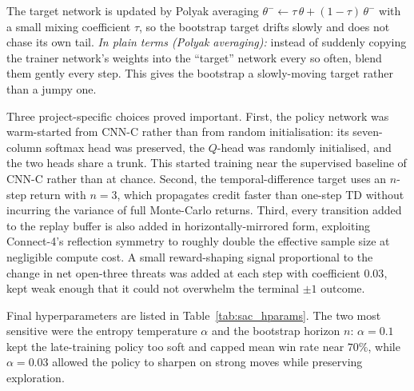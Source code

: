 \documentclass[11pt]{article}
\begin{document}
The target network is updated by Polyak averaging
$\theta^{-} \leftarrow \tau\,\theta + (1 - \tau)\,\theta^{-}$ with a
small mixing coefficient $\tau$, so the bootstrap target drifts slowly
and does not chase its own tail.
\textit{In plain terms (Polyak averaging):} instead of suddenly
copying the trainer network's weights into the ``target'' network
every so often, blend them gently every step. This gives the
bootstrap a slowly-moving target rather than a jumpy one.

Three project-specific choices proved important. First, the policy
network was warm-started from CNN-C rather than from random
initialisation: its seven-column softmax head was preserved, the
$Q$-head was randomly initialised, and the two heads share a trunk.
This started training near the supervised baseline of CNN-C rather
than at chance. Second, the
temporal-difference target uses an $n$-step return with $n = 3$, which
propagates credit faster than one-step TD without incurring the
variance of full Monte-Carlo returns. Third, every transition added to
the replay buffer is also added in horizontally-mirrored form,
exploiting Connect-4's reflection symmetry to roughly double the
effective sample size at negligible compute cost. A small reward-shaping
signal proportional to the change in net open-three threats was added
at each step with coefficient $0.03$, kept weak enough that it could
not overwhelm the terminal $\pm 1$ outcome.

Final hyperparameters are listed in Table~\ref{tab:sac_hparams}. The
two most sensitive were the entropy temperature $\alpha$ and the
bootstrap horizon $n$: $\alpha = 0.1$ kept the late-training policy
too soft and capped mean win rate near $70\%$, while $\alpha = 0.03$
allowed the policy to sharpen on strong moves while preserving
exploration.
\end{document}

